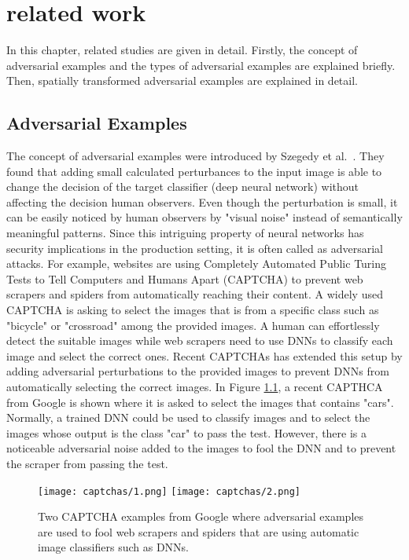 \chapter{related work}
\label{chp:2_literature}

In this chapter, related studies are given in detail. Firstly, the concept of adversarial examples and the types of adversarial examples are explained briefly. Then, spatially transformed adversarial examples are explained in detail.
\section{Adversarial Examples}

The concept of adversarial examples were introduced by Szegedy et al.~\cite{szegedy2013intriguing}. They found that adding small calculated perturbances to the input image is able to change the decision of the target classifier (deep neural network) without affecting the decision human observers. Even though the perturbation is small, it can be easily noticed by human observers by "visual noise" instead of semantically meaningful patterns. Since this intriguing property of neural networks has security implications in the production setting, it is often called as adversarial attacks. For example, websites are using Completely Automated Public Turing Tests to Tell Computers and Humans Apart (CAPTCHA) to prevent web scrapers and spiders from automatically reaching their content. A widely used CAPTCHA is asking to select the images that is from a specific class such as "bicycle" or "crossroad" among the provided images. A human can effortlessly detect the suitable images while web scrapers need to use DNNs to classify each image and select the correct ones. Recent CAPTCHAs has extended this setup by adding adversarial perturbations to the provided images to prevent DNNs from automatically selecting the correct images. In Figure \ref{fig:googlecaptcha}, a recent CAPTHCA from Google is shown where it is asked to select the images that contains "cars". Normally, a trained DNN could be used to classify images and to select the images whose output is the class "car" to pass the test. However, there is a noticeable adversarial noise added to the images to fool the DNN and to prevent the scraper from passing the test.
\begin{figure}[t]
    \centering
    \texttt{[image: captchas/1.png]}
    \texttt{[image: captchas/2.png]}
    \caption{Two CAPTCHA examples from Google where adversarial examples are used to fool web scrapers and spiders that are using automatic image classifiers such as DNNs.}\label{fig:googlecaptcha}
\end{figure}

